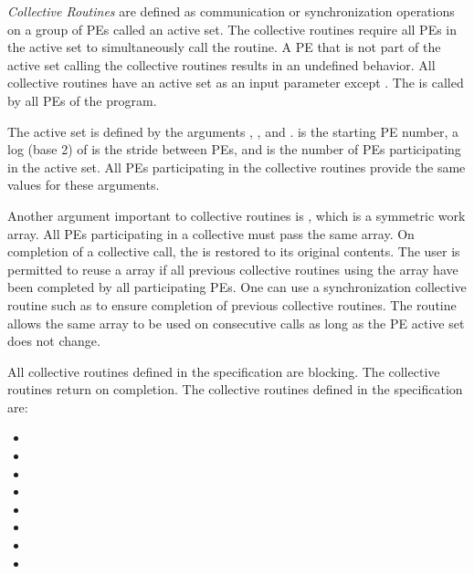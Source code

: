 \emph{Collective Routines}  are defined as communication 
or synchronization operations on a group of \acp{PE} called an active set.  
The collective routines require all \acp{PE} in the active set to simultaneously call the
routine.  A \ac{PE} that is not part of the active set calling the collective
routines results in an undefined behavior.  All collective routines have an
active set as an input parameter except \barrierall. The \barrierall is
called by all \acp{PE} of the \openshmem program. 

The active set is defined by the arguments , ,
and .   is the starting \ac{PE} number, a log (base
2) of  is the stride between \acp{PE}, and  is
the number of \acp{PE} participating in the active set.  All \acp{PE}
participating in the collective routines provide the same values for these
arguments. 
 
Another argument important to collective routines is , which is a
symmetric work array.  All \acp{PE} participating in a collective must pass the
same  array.  On completion of a collective call, the  is
restored to its original contents.  The user is permitted to reuse a 
array if all previous collective routines using the  array have been
completed by all participating \acp{PE}.  One can use a synchronization
collective routine such as \barrier to ensure completion of previous collective
routines. The  routine allows the same  array to
be used on consecutive calls as long as the \ac{PE} active set does not change. 

All collective routines defined in the specification are blocking.  The
collective routines return on completion.  The collective routines defined in
the \openshmem specification are:

\begin{itemize}
\item[] \broadcast 
\item[] \barrier
\item[] \barrierall
\item[] \collect
\item[] \fcollect
\item[] \reduction
\item[] \alltoall
\item[] \alltoalls
\end{itemize} 
